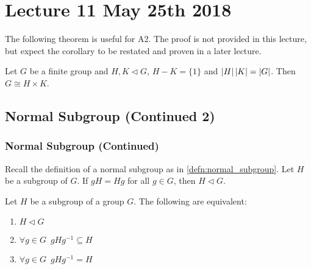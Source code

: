 \chapter{Lecture 11 May 25th 2018}%
\label{chp:lecture_11_may_25th_2018}

The following theorem is useful for A2. The proof is not provided in this lecture, but expect the corollary to be restated and proven in a later lecture.

\begin{crlynonum}
  Let $G$ be a finite group and $H, K \triangleleft G$, $H - K = \{1\}$ and $\left|H\right| \left|K\right| = \left|G\right|$. Then $G \cong H \times K$.
\end{crlynonum}

\section{Normal Subgroup (Continued 2)}%
\label{sec:normal_subgroup_continued_2}

\subsection{Normal Subgroup (Continued)}%
\label{sub:normal_subgroup_continued}

\begin{note}[Recall]
  Recall the definition of a normal subgroup as in \cref{defn:normal_subgroup}. Let $H$ be a subgroup of $G$. If $gH = Hg$ for all $g \in G$, then $H \triangleleft G$.
\end{note}

\begin{propo}
\label{propo:normality_test}
  Let $H$ be a subgroup of a group $G$. The following are equivalent:
  \begin{enumerate}
    \item $H \triangleleft G$
    \item $\forall g \in G \enspace gHg^{-1} \subseteq H$
    \item $\forall g \in G \enspace gHg^{-1} = H$
  \end{enumerate}
\end{propo}

